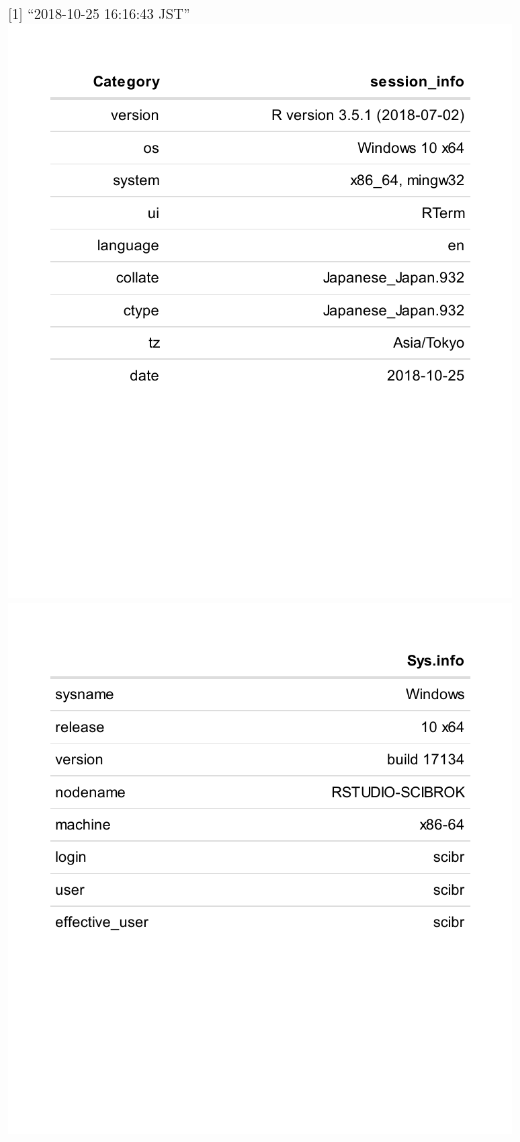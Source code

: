 \documentclass[]{article}
\begin{document}
{[}1{]} ``2018-10-25 16:16:43 JST''
\includegraphics{ryo-eng_files/figure-latex/info-1.pdf}
\includegraphics{ryo-eng_files/figure-latex/info-2.pdf}
\end{document}
